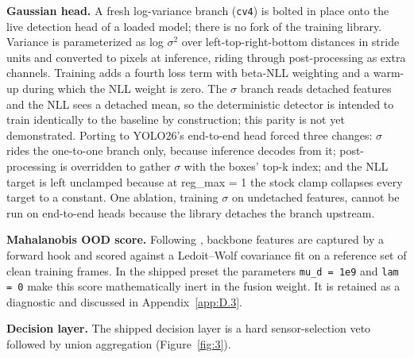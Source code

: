 \documentclass[10pt]{article}
\begin{document}
\textbf{Gaussian head.} A fresh log-variance branch (\texttt{cv4}) is bolted in place onto the live detection head of a loaded model; there is no fork of the training library. Variance is parameterized as log $\sigma$$^{2}$ over left-top-right-bottom distances in stride units and converted to pixels at inference, riding through post-processing as extra channels. Training adds a fourth loss term with beta-NLL weighting \citep{seitzer2022on} and a warm-up during which the NLL weight is zero. The $\sigma$ branch reads detached features and the NLL sees a detached mean, so the deterministic detector is intended to train identically to the baseline by construction; this parity is not yet demonstrated. Porting to YOLO26's end-to-end head forced three changes: $\sigma$ rides the one-to-one branch only, because inference decodes from it; post-processing is overridden to gather $\sigma$ with the boxes' top-k index; and the NLL target is left unclamped because at reg\_max = 1 the stock clamp collapses every target to a constant. One ablation, training $\sigma$ on undetached features, cannot be run on end-to-end heads because the library detaches the branch upstream.

\textbf{Mahalanobis OOD score.} Following \citet{lee2018a}, backbone features are captured by a forward hook and scored against a Ledoit--Wolf covariance \citep{ledoit2004a} fit on a reference set of clean training frames. In the shipped preset the parameters \texttt{mu\_\allowbreak{}d = 1e9} and \texttt{lam = 0} make this score mathematically inert in the fusion weight. It is retained as a diagnostic and discussed in Appendix~\ref{app:D.3}.

\textbf{Decision layer.} The shipped decision layer is a hard sensor-selection veto followed by union aggregation (Figure~\ref{fig:3}).
\end{document}
